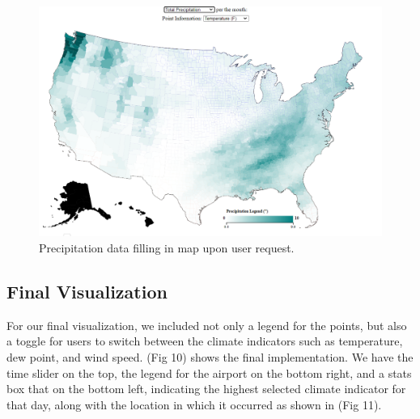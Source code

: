 \documentclass[10pt,twocolumn,twoside]{opticajnl}
\begin{document}
\begin{figure}
	\centering
	\includegraphics[scale=0.25]{images/precMap.png}
	\caption{Precipitation data filling in map upon user request.}
\end{figure}

\subsection {Final Visualization}

For our final visualization, we included not only a legend for the points, but also a toggle for users to switch between the climate indicators such as temperature, dew point, and wind speed. (Fig 10) shows the final implementation. We have the time slider on the top, the legend for the airport on the bottom right, and a stats box that on the bottom left, indicating the highest selected climate indicator for that day, along with the location in which it occurred as shown in (Fig 11).
\end{document}
